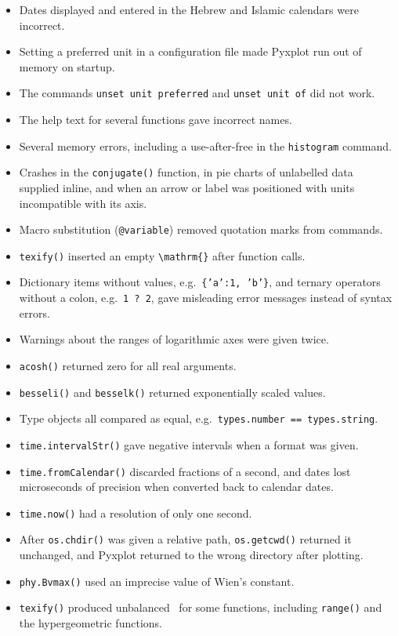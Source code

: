 \begin{itemize}
\item Dates displayed and entered in the Hebrew and Islamic calendars were incorrect.
\item Setting a preferred unit in a configuration file made Pyxplot run out of memory on startup.
\item The commands {\tt unset unit preferred} and {\tt unset unit of} did not work.
\item The help text for several functions gave incorrect names.
\item Several memory errors, including a use-after-free in the {\tt histogram} command.
\item Crashes in the {\tt conjugate()} function, in pie charts of unlabelled data supplied inline, and when an arrow or label was positioned with units incompatible with its axis.
\item Macro substitution ({\tt @variable}) removed quotation marks from commands.
\item {\tt texify()} inserted an empty {\tt \textbackslash mathrm\{\}} after function calls.
\item Dictionary items without values, e.g.\ {\tt \{'a':1, 'b'\}}, and ternary operators without a colon, e.g.\ {\tt 1 ? 2}, gave misleading error messages instead of syntax errors.
\item Warnings about the ranges of logarithmic axes were given twice.
\item {\tt acosh()} returned zero for all real arguments.
\item {\tt besseli()} and {\tt besselk()} returned exponentially scaled values.
\item Type objects all compared as equal, e.g.\ {\tt types.number == types.string}.
\item {\tt time.intervalStr()} gave negative intervals when a format was given.
\item {\tt time.fromCalendar()} discarded fractions of a second, and dates lost microseconds of precision when converted back to calendar dates.
\item {\tt time.now()} had a resolution of only one second.
\item After {\tt os.chdir()} was given a relative path, {\tt os.getcwd()} returned it unchanged, and Pyxplot returned to the wrong directory after plotting.
\item {\tt phy.Bvmax()} used an imprecise value of Wien's constant.
\item {\tt texify()} produced unbalanced \latexdcf\ for some functions, including {\tt range()} and the hypergeometric functions.

\end{itemize}

